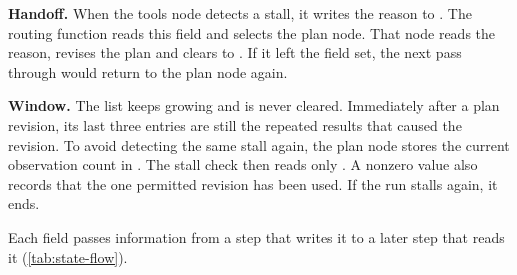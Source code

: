 \bi

\item \textbf{Handoff.} When the tools node detects a stall, it writes the reason to
. The routing function reads this field and selects the plan node. That node
reads the reason, revises the plan and clears  to . If it left
the field set, the next pass through  would return to the plan node again.

\item \textbf{Window.} The  list keeps growing and is never cleared.
Immediately after a plan revision, its last three entries are still the repeated results that
caused the revision. To avoid detecting the same stall again, the plan node stores the current
observation count in . The stall check then reads only
. A nonzero value also records that the one permitted
revision has been used. If the run stalls again, it ends.

\ei

Each field passes information from a step that writes it to a later step that reads it
(\cref{tab:state-flow}).

